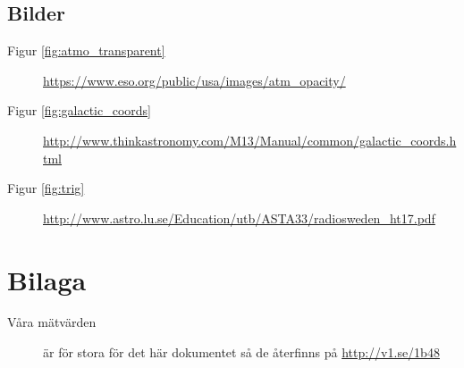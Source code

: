 \documentclass[a4paper,12pt]{report}
\begin{document}
\section{Bilder}
\begin{description}
    \item [Figur \ref{fig:atmo_transparent}] \url{https://www.eso.org/public/usa/images/atm_opacity/}
    \item [Figur \ref{fig:galactic_coords}] \url{http://www.thinkastronomy.com/M13/Manual/common/galactic_coords.html}
    \item [Figur \ref{fig:trig}] \url{http://www.astro.lu.se/Education/utb/ASTA33/radiosweden_ht17.pdf}
\end{description}

\chapter{Bilaga}
\begin{description}
    \item [Våra mätvärden] är för stora för det här dokumentet så de återfinns på \url{http://v1.se/1b48}
\end{description}
\end{document}
